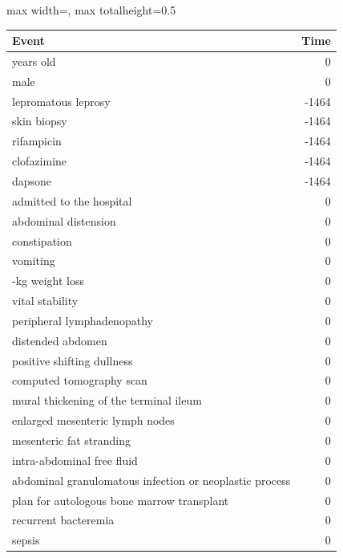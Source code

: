 \begin{ChSixUncaptionedFigure}
\begin{ChSixFloatBody}

\centering
\begin{adjustbox}{max width=\linewidth, max totalheight=0.5\textheight}
\begin{tcolorbox}

\begin{minipage}[t]{0.49\textwidth}\vspace{0pt}
\begin{tcolorbox}[ChSix/annobox,title={DeepSeek-R1-IQ1 annotation}]
\ChSixAnnotationTableStyle
\begin{tabular}{>{\raggedright\arraybackslash}p{} r}
\toprule
\textbf{Event} & \textbf{Time} \\
\midrule
57 years old & 0 \\
male & 0 \\
lepromatous leprosy & -1464 \\
skin biopsy & -1464 \\
rifampicin & -1464 \\
clofazimine & -1464 \\
dapsone & -1464 \\
admitted to the hospital & 0 \\
abdominal distension & 0 \\
constipation & 0 \\
vomiting & 0 \\
10-kg weight loss & 0 \\
vital stability & 0 \\
peripheral lymphadenopathy & 0 \\
distended abdomen & 0 \\
positive shifting dullness & 0 \\
computed tomography scan & 0 \\
mural thickening of the terminal ileum & 0 \\
enlarged mesenteric lymph nodes & 0 \\
mesenteric fat stranding & 0 \\
intra-abdominal free fluid & 0 \\
abdominal granulomatous infection or neoplastic process & 0 \\
plan for autologous bone marrow transplant & 0 \\
recurrent bacteremia & 0 \\
sepsis & 0 \\

\end{tabular}
\end{tcolorbox}
\end{minipage}
\end{tcolorbox}
\end{adjustbox}
\end{ChSixFloatBody}
\end{ChSixUncaptionedFigure}
